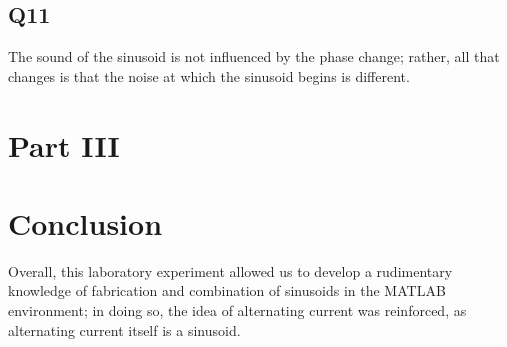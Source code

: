 \documentclass[
	letterpaper, %
	10pt, %
]{CSUniSchoolLabReport}
\begin{document}
\subsection{Q11} The sound of the sinusoid is not influenced by the phase change; rather, all that changes is that the noise at which the sinusoid begins is different.

\section{Part III}

\section{Conclusion}

Overall, this laboratory experiment allowed us to develop a rudimentary knowledge of fabrication and combination of sinusoids in the MATLAB environment; in doing so, the idea of alternating current was reinforced, as alternating current itself is a sinusoid.
\end{document}
